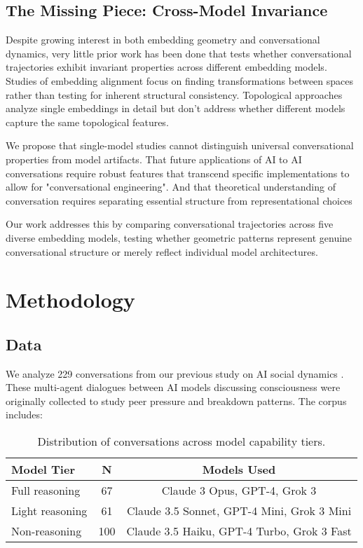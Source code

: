\documentclass[11pt,letterpaper]{article}
\newcommand{\totalConversations}{229}
\begin{document}
\subsection{The Missing Piece: Cross-Model Invariance}

Despite growing interest in both embedding geometry and conversational dynamics, very little prior work has been done that tests whether conversational trajectories exhibit invariant properties across different embedding models. Studies of embedding alignment \citep{conneau2018word} focus on finding transformations between spaces rather than testing for inherent structural consistency. Topological approaches \citep{jakubowski2020topology, vukovic2022dialogue} analyze single embeddings in detail but don't address whether different models capture the same topological features.

We propose that single-model studies cannot distinguish universal conversational properties from model artifacts. That future applications of AI to AI conversations require robust features that transcend specific implementations to allow for "conversational engineering". And that theoretical understanding of conversation requires separating essential structure from representational choices

Our work addresses this by comparing conversational trajectories across five diverse embedding models, testing whether geometric patterns represent genuine conversational structure or merely reflect individual model architectures.

\section{Methodology}

\subsection{Data}

We analyze \totalConversations{} conversations from our previous study on AI social dynamics \citep{garcia2025peer}. These multi-agent dialogues between AI models discussing consciousness were originally collected to study peer pressure and breakdown patterns. The corpus includes:

\begin{table}[h]
\centering
\begin{tabular}{lcc}
\toprule
Model Tier & N & Models Used \\
\midrule
Full reasoning & 67 & Claude 3 Opus, GPT-4, Grok 3 \\
Light reasoning & 61 & Claude 3.5 Sonnet, GPT-4 Mini, Grok 3 Mini \\
Non-reasoning & 100 & Claude 3.5 Haiku, GPT-4 Turbo, Grok 3 Fast \\
\bottomrule
\end{tabular}
\caption{Distribution of conversations across model capability tiers.}
\label{tab:model_tiers}
\end{table}
\end{document}
